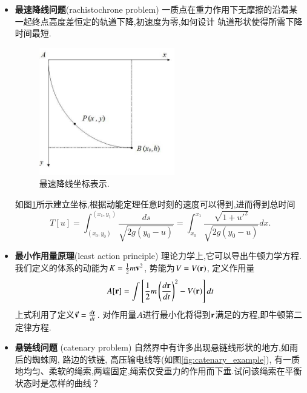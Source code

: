 \begin{itemize}
  \item \textbf{最速降线问题}(rachistochrone problem) 一质点在重力作用下无摩擦的沿着某一起终点高度差恒定的轨道下降,初速度为零,如何设计
  轨道形状使得所需下降时间最短.
  \begin{figure}
    \centering
    \includegraphics[width=0.5\linewidth,height=15em]{fastest_track.png}
    \caption{最速降线坐标表示.}
    \label{fig:rachistochrone}
  \end{figure}
  如图\ref{fig:rachistochrone}所示建立坐标,根据动能定理任意时刻的速度可以得到,进而得到总时间
  \begin{equation}
    T[u] = \int_{(x_0,y_0)}^{(x_1, y_1)} \frac{ds}{\sqrt{2 g(y_0 - u)}} = \int_{x_0}^{x_1} \frac{\sqrt{1+u'^2}}{\sqrt{2 g (y_0 - u)}} dx.
  \end{equation}

  \item \textbf{最小作用量原理}(least action principle) 理论力学上,它可以导出牛顿力学方程.我们定义的体系的动能为$K = {\frac{1}{2}} m {\mathbf{v}}^2$,
  势能为$V = V({\mathbf{r}})$, 定义作用量
  \begin{equation}
    A[{\mathbf{r}}] = \int \left[ {\frac{1}{2}} m \left( \frac{d{\mathbf{r}}}{dt} \right)^2 - V({\mathbf{r}}) \right] dt 
  \end{equation}
  上式利用了定义$\vec{{\mathbf{v}}} = \frac{d{\mathbf{r}}}{dt}$. 对作用量$A$进行最小化将得到${\mathbf{r}}$满足的方程,即牛顿第二定律方程.

  \item \textbf{悬链线问题} (catenary problem) \quad 自然界中有许多出现悬链线形状的地方,如雨后的蜘蛛网, 路边的铁链, 高压输电线等(如图\ref{fig:catenary_example}), 有一质地均匀、柔软的绳索,两端固定,绳索仅受重力的作用而下垂.试问该绳索在平衡状态时是怎样的曲线？
  \begin{figure}
    \centering


\end{figure}
\end{itemize}
